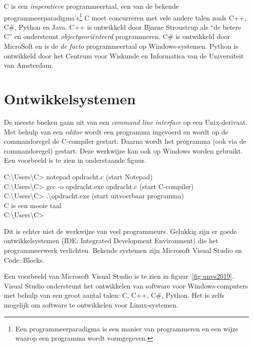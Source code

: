 C is een \textsl{imperatieve} programmeertaal, een van de bekende programmeerparadigma's\footnote{Een programmeerparadigma is een manier van programmeren en een wijze waarop een programma wordt vormgegeven.}
C moet concurreren met vele andere talen zoals C++, C\#, Python en Java. C++ is ontwikkeld door Bjarne Stroustrup als ``de betere C'' en ondersteunt \textsl{objectgeoriënteerd} programmeren. C\# is ontwikkeld door MicroSoft en is de \textsl{de facto} programmeertaal op Windows-systemen. Python is ontwikkeld door het Centrum voor Wiskunde en Informatica van de Universiteit van Amsterdam. 

\section{Ontwikkelsystemen}
De meeste boeken gaan uit van een \textsl{command line interface} op een Unix-derivaat. Met behulp van een \textsl{editor} wordt een programma ingevoerd en wordt op de commandoregel de C-compiler gestart. Daarna wordt het programma (ook via de commandoregel) gestart. Deze werkwijze kan ook op Windows worden gebruikt. Een voorbeeld is te zien in onderstaande figuur.

\begin{dosbox}
C:\textbackslash Users\textbackslash C> notepad opdracht.c \hfill\textrm{(start Notepad)} \\
C:\textbackslash Users\textbackslash C> gcc -o opdracht.exe opdracht.c \hfill\textrm{(start C-compiler)}\\
C:\textbackslash Users\textbackslash C> .\textbackslash opdracht.exe \hfill\textrm{(start uitvoerbaar programma)}\\
C is een mooie taal \\
C:\textbackslash Users\textbackslash C>
\end{dosbox}

Dit is echter niet de werkwijze van veel programmeurs. Gelukkig zijn er goede ontwikkelsystemen (IDE: Integrated Development Environment) die het programmeerwerk verlichten. Bekende systemen zijn Microsoft Visual Studio en Code::Blocks.

Een voorbeeld van Microsoft Visual Studio is te zien in figuur~\ref{fig:unvs2019}. Visual Studio ondersteunt het ontwikkelen van software voor Windows-computers met behulp van een groot aantal talen: C, C++, C\#, Python. Het is zelfs mogelijk om software te ontwikkelen voor Linux-systemen.



